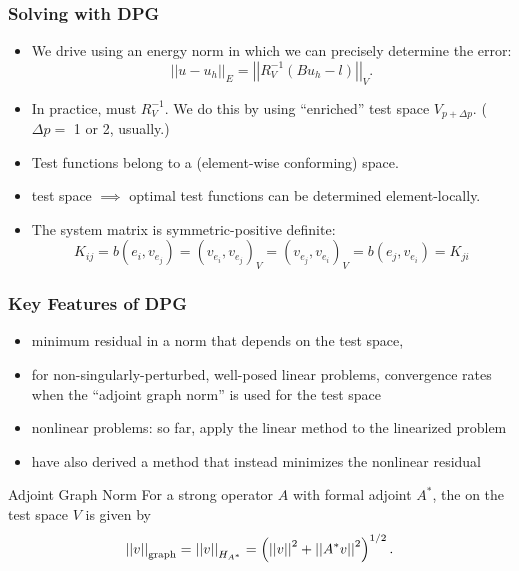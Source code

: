 \documentclass[mathserif]{beamer}
\newcommand{\NVRnorm}[1]{\left|\left|#1\right|\right|}
\newcommand{\pecosbold}[1]{{\color{pecos2}{#1}}}
\begin{document}
\begin{frame}                                                                                                                                                                          
\frametitle{Solving with DPG}
\begin{itemize}
\item We drive \pecosbold{adaptivity} using an energy norm in which we can precisely determine the error:
\[
\NVRnorm{u-u_{h}}_{E} = \NVRnorm{R_{V}^{-1}\left(Bu_{h} - l \right)}_{V}.
\]
\item In practice, must \pecosbold{approximate} $R_{V}^{-1}$.  We do this by using ``enriched'' test space $V_{p+\Delta p}$.  ($\Delta p=$ 1 or 2, usually.)
\item Test functions belong to a \pecosbold{broken} (element-wise conforming) space.
\item \pecosbold{Discontinuous} test space $\implies$ optimal test functions can be determined element-locally.
\item The system matrix is symmetric-positive definite:
\[
K_{ij} = b(e_{i}, v_{e_{j}}) = (v_{e_{i}}, v_{e_{j}})_{V} = (v_{e_{j}}, v_{e_{i}})_{V} = b(e_{j}, v_{e_{i}}) = K_{ji}
\]
\end{itemize}

\end{frame}

\begin{frame}
\frametitle{Key Features of DPG}\small
\begin{itemize}
\item \pecosbold{guarantees} minimum residual in a norm that depends on the test space, \pecosbold{a free choice}
\item for non-singularly-perturbed, well-posed linear problems, \pecosbold{provably optimal} convergence rates when the ``adjoint graph norm'' is used for the test space
\item nonlinear problems: so far, apply the linear method to the linearized problem
\item have also derived a method that instead minimizes the nonlinear residual
\end{itemize}
\begin{block}{Adjoint Graph Norm}
For a strong operator $A$ with formal adjoint $A^{*}$, the \pecosbold{adjoint graph norm} on the test space $V$ is given by
\[
\NVRnorm{v}_{\rm graph} = \NVRnorm{v}_{H_{A^{*}}} = \left( \NVRnorm{v}^{2} + \NVRnorm{A^{*}v}^{2}\right)^{1/2}.
\]
\end{block}
\end{frame}
\end{document}
